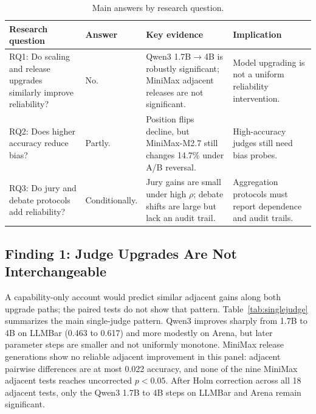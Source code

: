\documentclass[sigconf,nonacm]{acmart}
\begin{document}
\begin{table}[t]
\centering
\caption{Main answers by research question.}
\label{tab:rqanswers}
\scriptsize
\begin{tabular}{p{}p{}p{}p{}}
\toprule
Research question & Answer & Key evidence & Implication \\
\midrule
RQ1: Do scaling and release upgrades similarly improve reliability? & No. & Qwen3 1.7B$\rightarrow$4B is robustly significant; MiniMax adjacent releases are not significant. & Model upgrading is not a uniform reliability intervention. \\
RQ2: Does higher accuracy reduce bias? & Partly. & Position flips decline, but MiniMax-M2.7 still changes 14.7\% under A/B reversal. & High-accuracy judges still need bias probes. \\
RQ3: Do jury and debate protocols add reliability? & Conditionally. & Jury gains are small under high $\rho$; debate shifts are large but lack an audit trail. & Aggregation protocols must report dependence and audit trails. \\
\bottomrule
\end{tabular}
\end{table}

\subsection{Finding 1: Judge Upgrades Are Not Interchangeable}

A capability-only account would predict similar adjacent gains along both upgrade paths; the paired tests do not show that pattern. Table~\ref{tab:singlejudge} summarizes the main single-judge pattern. Qwen3 improves sharply from 1.7B to 4B on LLMBar (0.463 to 0.617) and more modestly on Arena, but later parameter steps are smaller and not uniformly monotone. MiniMax release generations show no reliable adjacent improvement in this panel: adjacent pairwise differences are at most 0.022 accuracy, and none of the nine MiniMax adjacent tests reaches uncorrected $p<0.05$. After Holm correction across all 18 adjacent tests, only the Qwen3 1.7B to 4B steps on LLMBar and Arena remain significant.
\end{document}
